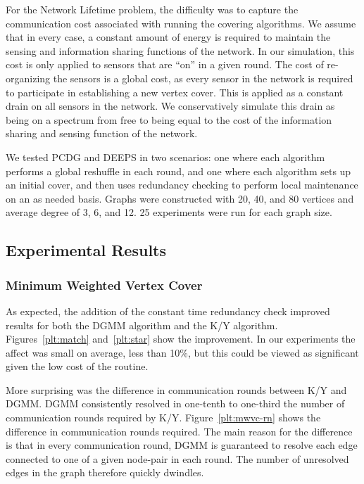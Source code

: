 For the Network Lifetime problem, the difficulty was to capture the communication cost associated with running the covering algorithms. We assume that in every case, a constant amount of energy is required to maintain the sensing and information sharing functions of the network. In our simulation, this cost is only applied to sensors that are ``on'' in a given round. The cost of re-organizing the sensors is a global cost, as every sensor in the network is required to participate in establishing a new vertex cover. This is applied as a constant drain on all sensors in the network. We conservatively simulate this drain as being on a spectrum from free to being equal to the cost of the information sharing and sensing function of the network. 

We tested PCDG and DEEPS in two scenarios: one where each algorithm performs a global reshuffle in each round, and one where each algorithm sets up an initial cover, and then uses redundancy checking to perform local maintenance on an as needed basis. Graphs were constructed with 20, 40, and 80 vertices and average degree of 3, 6, and 12. 25 experiments were run for each graph size.
 
\subsection{Experimental Results}
\label{sub:exp-results}
\subsubsection{Minimum Weighted Vertex Cover}
\label{sub:mwvc-results}
As expected, the addition of the constant time redundancy check improved results for both the DGMM algorithm and the K/Y algorithm. Figures~\ref{plt:match} and~\ref{plt:star} show the improvement. In our experiments the affect was small on average, less than 10\%, but this could be viewed as significant given the low cost of the routine. 


More surprising was the difference in communication rounds between K/Y and DGMM. DGMM consistently resolved in one-tenth to one-third the number of communication rounds required by K/Y. Figure~\ref{plt:mwvc-rn} shows the difference in communication rounds required. The main reason for the difference is that in every communication round, DGMM is guaranteed to resolve each edge connected to one of a given node-pair in each round. The number of unresolved edges in the graph therefore quickly dwindles.

